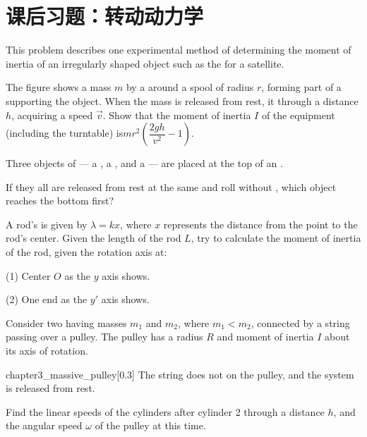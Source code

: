 \newpage
\section{课后习题：转动动力学}
\begin{example}
	This problem describes one experimental method of
	determining the moment of inertia of an irregularly
	shaped object such as the  for a satellite. 
	\begin{center}
	\end{center}
	
	The figure shows a mass $m$  by a  
	around a spool of radius $r$, forming part of a 
	supporting the object. When the mass is released from
	rest, it  through a distance $h$, acquiring a speed
	$\vec{v}$. Show that the moment of inertia $I$ of the equipment
	(including the turntable) is\quad$mr^2(\dfrac{2gh}{v^2}-1)$. 
\end{example}
\begin{example}
	Three objects of  --- a , a , and a  --- are placed at the top of
	an . 
	\begin{center}
	\end{center}
	If they all are released from rest
	at the same  and roll without , which object reaches the bottom first?
\end{example}
\begin{example}
	A rod's  is given by $\lambda=kx$, where $x$ represents the distance from the point to the rod's center. 
	Given the length of the rod $L$, try to calculate the moment of inertia of the rod, given the rotation axis at:
	
	(1) Center $O$ as the $y$ axis shows.
	
	(2) One end as the $y'$ axis shows.
\end{example}
\begin{example}
	Consider two  having masses $m_1$
	and $m_2$, where $m_1 < m_2$, connected by a
	string passing over a pulley. The pulley
	has a radius $R$ and moment of inertia $I$
	about its axis of rotation.
	\begin{singlefigure}{chapter3_massive_pulley}[0.3]
		The string does
		not  on the pulley, and the system
		is released from rest. 
	\end{singlefigure}
	 Find the linear
	speeds of the cylinders after
	cylinder 2  through a
	distance $h$, and the angular
	speed $\omega$ of the pulley at this time.
\end{example}
